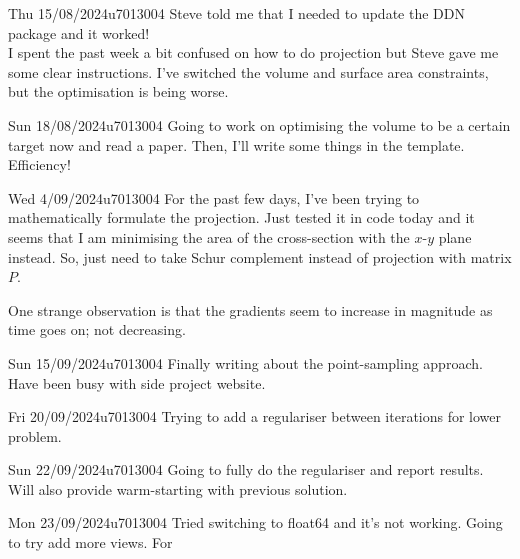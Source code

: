 \documentclass{project-logbook}
\begin{document}
	\begin{MeetingMinutes}{Thu 15/08/2024}{u7013004}
		Steve told me that I needed to update the DDN package and it worked!\\
		I spent the past week a bit confused on how to do projection but Steve gave me some clear instructions. I've switched the volume and surface area constraints, but the optimisation is being worse.
	\end{MeetingMinutes}

	\begin{MeetingMinutes}{Sun 18/08/2024}{u7013004}
		Going to work on optimising the volume to be a certain target now and read a paper. Then, I'll write some things in the template. Efficiency!
	\end{MeetingMinutes}

	\begin{MeetingMinutes}{Wed 4/09/2024}{u7013004}
		For the past few days, I've been trying to mathematically formulate the projection. Just tested it in code today and it seems that I am minimising the area of the cross-section with the $x$-$y$ plane instead. So, just need to take Schur complement instead of projection with matrix $P$.

		One strange observation is that the gradients seem to increase in magnitude as time goes on; not decreasing.
	\end{MeetingMinutes}
	
	\begin{MeetingMinutes}{Sun 15/09/2024}{u7013004}
		Finally writing about the point-sampling approach. Have been busy with side project website.
	\end{MeetingMinutes}

	\begin{MeetingMinutes}{Fri 20/09/2024}{u7013004}
		Trying to add a regulariser between iterations for lower problem.
	\end{MeetingMinutes}

	\begin{MeetingMinutes}{Sun 22/09/2024}{u7013004}
		Going to fully do the regulariser and report results. Will also provide warm-starting with previous solution. 
	\end{MeetingMinutes}

	\begin{MeetingMinutes}{Mon 23/09/2024}{u7013004}
		Tried switching to float64 and it's not working. Going to try add more views. For 
	\end{MeetingMinutes}
\end{document}
